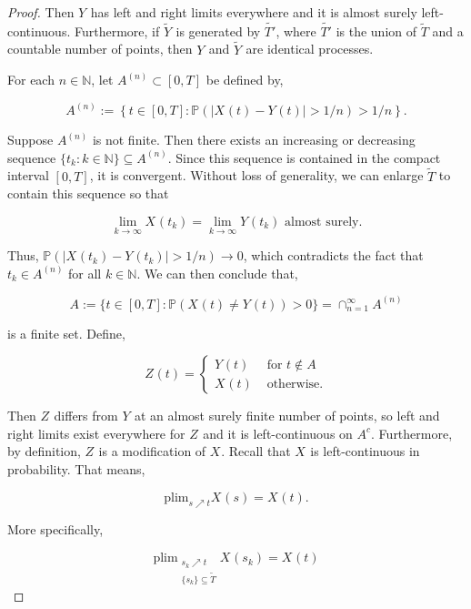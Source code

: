 \documentclass[12pt]{article}
\newcommand{\mb}{\mathbb}
\newcommand{\ra}{\rightarrow}
\newcommand{\te}{\text}
\newcommand{\ind}{\hspace{24pt}}
\newcommand{\pr}{\mb{P}}							%
\newcommand{\T}{T}								%
\renewcommand{\t}{t}							%
\renewcommand{\tt}{s}							%
\newcommand{\X}{X}								%
\newcommand{\cind}[1]{_{#1}}					%
\newcommand{\tp}[1]{(#1)}						%
\newcommand{\tip}[1]{#1}						%
\newcommand{\sln}[1]{^{(#1)}}					%
\newcommand{\alt}[1]{\widetilde{#1}}			%
\newcommand{\indx}[1]{_{#1}}					%
\newcommand{\XX}{Y}								%
\newcommand{\XXX}{Z}							%
\renewcommand{\it}{k}							%
\newcommand{\Tset}{\alt{T}}						%
\newcommand{\typset}{A}							%
\begin{document}
\begin{proof}
Then \(\XX\cind{}\tip{}\) has left and right limits everywhere and it is almost surely left-continuous. Furthermore, if \(\alt{\XX\cind{}\tip{}}\) is generated by \(\alt{T'}\), where \(\alt{T'}\) is the union of \(\Tset\) and a countable number of points, then \(\XX\cind{}\tip{}\) and \(\alt{\XX\cind{}\tip{}}\) are identical processes. 

\ind For each \(n \in \mb{N}\), let \(\typset\sln{n} \subset [0,\T]\) be defined by,

\[\typset\sln{n} := \left\{\t\in [0,\T]: \pr\left(|\X\cind{}\tp{\t} - \XX\cind{}\tp{\t}| > 1/n\right) > 1/n\right\}.\] 

Suppose \(\typset\sln{n}\) is not finite. Then there exists an increasing or decreasing sequence \(\{\t\indx{\it}:\it\in \mb{N}\}\subseteq \typset\sln{n}\). Since this sequence is contained in the compact interval \([0,\T]\), it is convergent. Without loss of generality, we can enlarge \(\Tset\) to contain this sequence so that

\[\lim_{\it \ra\infty} \X\cind{}\tp{\t\indx{\it}} = \lim_{\it\ra\infty} \XX\cind{}\tp{\t\indx{\it}} \te{ almost surely.}\]

Thus, \(\pr(|\X\cind{}\tp{\t\indx{\it}} - \XX\cind{}\tp{\t\indx{\it}}| > 1/n) \ra 0\), which contradicts the fact that \(\t\indx{\it} \in \typset\sln{n}\) for all \(\it\in\mb{N}\). We can then conclude that,

\[\typset:= \{\t\in [0,\T]: \pr(\X\cind{}\tp{\t} \neq \XX\cind{}\tp{\t}) > 0\} = \cap_{n = 1}^\infty \typset\sln{n}\]

is a finite set. Define,

\[\XXX\cind{}\tp{\t}= \begin{cases}
\XX\cind{}\tp{\t} &\te{ for } \t \notin \typset\\
\X\cind{}\tp{\t} &\te{ otherwise.}
\end{cases}\]

Then \(\XXX\cind{}\tip{}\) differs from \(\XX\cind{}\tip{}\) at an almost surely finite number of points, so left and right limits exist everywhere for \(\XXX\cind{}\tip{}\) and it is left-continuous on \(\typset^c\). Furthermore, by definition, \(\XXX\cind{}\tip{}\) is a modification of \(\X\cind{}\tip{}\). Recall that \(\X\cind{}\tip{}\) is left-continuous in probability. That means,

\[\te{plim}_{\tt\nearrow \t} \X\cind{}\tp{\tt} = \X\cind{}\tp{\t}.\]

More specifically,

\[\te{plim}_{\substack{\tt\indx{\it}\nearrow \t\\\{\tt\indx{\it}\} \subseteq \Tset}} \X\cind{}\tp{\tt\indx{\it}} = \X\cind{}\tp{\t}\]


\end{proof}
\end{document}
